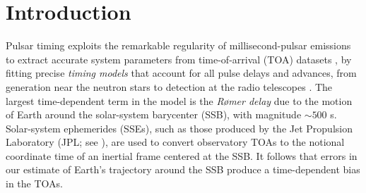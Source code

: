 \documentclass{aastex63}
\begin{document}


\section{Introduction}
\label{sec:intro}

Pulsar timing exploits the remarkable regularity of millisecond-pulsar emissions to extract accurate system parameters from time-of-arrival (TOA) datasets \citep{2012hpa..book.....L},
by fitting precise \emph{timing models} that account for all pulse delays and advances, from generation near the neutron stars to detection at the radio telescopes \citep{2013CQGra..30v4001L}.
The largest time-dependent term in the model is the \emph{R{\o}mer delay} \citep{Roemer1676} due to the motion of Earth around the solar-system barycenter (SSB), with magnitude $\sim 500$ s. Solar-system ephemerides (SSEs), such as those produced by the Jet Propulsion Laboratory (JPL; see \citealt{2009IPNPR.178C...1F,2014IPNPR.196C...1F,de435,de436,de438}), are used to convert observatory TOAs to the notional coordinate time of an inertial frame centered at the SSB.
It follows that errors in our estimate of Earth's trajectory around the SSB produce a time-dependent bias in the TOAs.
\end{document}
